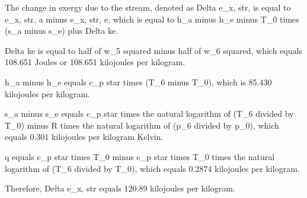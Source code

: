 The change in exergy due to the stream, denoted as Delta e_x, str, is equal to e_x, str, a minus e_x, str, e, which is equal to h_a minus h_e minus T_0 times (s_a minus s_e) plus Delta ke.

Delta ke is equal to half of w_5 squared minus half of w_6 squared, which equals 108.651 Joules or 108.651 kilojoules per kilogram.

h_a minus h_e equals c_p star times (T_6 minus T_0), which is 85.430 kilojoules per kilogram.

s_a minus s_e equals c_p star times the natural logarithm of (T_6 divided by T_0) minus R times the natural logarithm of (p_6 divided by p_0), which equals 0.301 kilojoules per kilogram Kelvin.

q equals c_p star times T_0 minus c_p star times T_0 times the natural logarithm of (T_6 divided by T_0), which equals 0.2874 kilojoules per kilogram.

Therefore, Delta e_x, str equals 120.89 kilojoules per kilogram.
